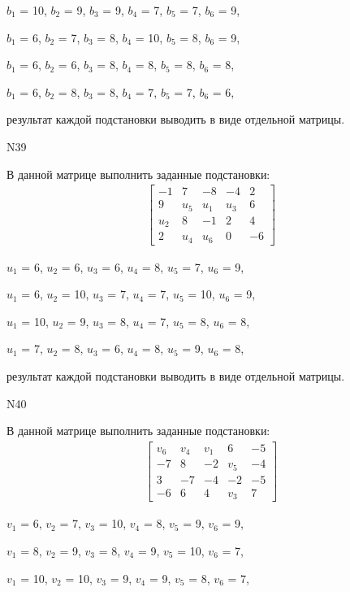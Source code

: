 \documentclass[11pt]{report}
\begin{document}
$b_{1}$ = 10, $b_{2}$ = 9, $b_{3}$ = 9, $b_{4}$ = 7, $b_{5}$ = 7, $b_{6}$ = 9, 

$b_{1}$ = 6, $b_{2}$ = 7, $b_{3}$ = 8, $b_{4}$ = 10, $b_{5}$ = 8, $b_{6}$ = 9, 

$b_{1}$ = 6, $b_{2}$ = 6, $b_{3}$ = 8, $b_{4}$ = 8, $b_{5}$ = 8, $b_{6}$ = 8, 

$b_{1}$ = 6, $b_{2}$ = 8, $b_{3}$ = 8, $b_{4}$ = 7, $b_{5}$ = 7, $b_{6}$ = 6, 

результат каждой подстановки выводить в виде отдельной матрицы.

N39

В данной матрице выполнить заданные подстановки:
\begin{align*}
\left[\begin{matrix}-1 & 7 & -8 & -4 & 2\\9 & u_{5} & u_{1} & u_{3} & 6\\u_{2} & 8 & -1 & 2 & 4\\2 & u_{4} & u_{6} & 0 & -6\end{matrix}\right]
\end{align*}


$u_{1}$ = 6, $u_{2}$ = 6, $u_{3}$ = 6, $u_{4}$ = 8, $u_{5}$ = 7, $u_{6}$ = 9, 

$u_{1}$ = 6, $u_{2}$ = 10, $u_{3}$ = 7, $u_{4}$ = 7, $u_{5}$ = 10, $u_{6}$ = 9, 

$u_{1}$ = 10, $u_{2}$ = 9, $u_{3}$ = 8, $u_{4}$ = 7, $u_{5}$ = 8, $u_{6}$ = 8, 

$u_{1}$ = 7, $u_{2}$ = 8, $u_{3}$ = 6, $u_{4}$ = 8, $u_{5}$ = 9, $u_{6}$ = 8, 

результат каждой подстановки выводить в виде отдельной матрицы.

N40

В данной матрице выполнить заданные подстановки:
\begin{align*}
\left[\begin{matrix}v_{6} & v_{4} & v_{1} & 6 & -5\\-7 & 8 & -2 & v_{5} & -4\\3 & -7 & -4 & -2 & -5\\-6 & 6 & 4 & v_{3} & 7\end{matrix}\right]
\end{align*}


$v_{1}$ = 6, $v_{2}$ = 7, $v_{3}$ = 10, $v_{4}$ = 8, $v_{5}$ = 9, $v_{6}$ = 9, 

$v_{1}$ = 8, $v_{2}$ = 9, $v_{3}$ = 8, $v_{4}$ = 9, $v_{5}$ = 10, $v_{6}$ = 7, 

$v_{1}$ = 10, $v_{2}$ = 10, $v_{3}$ = 9, $v_{4}$ = 9, $v_{5}$ = 8, $v_{6}$ = 7, 
\end{document}
